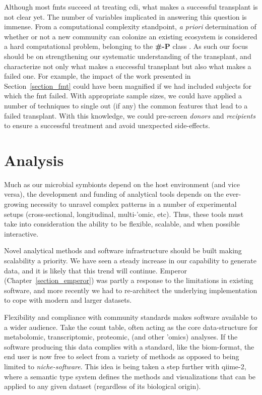 Although most \glspl{fmt} succeed at treating \gls{cdi}, what makes a
successful transplant is not clear yet. The number of variables implicated in
answering this question is immense. From a computational complexity standpoint,
\textit{a priori} determination of whether or not a new community can colonize 
an existing ecosystem is considered a hard computational problem, belonging to 
the \textbf{\#-P} class \cite{RN4266}. As such our focus should be on 
strengthening our systematic understanding of the transplant, and characterize 
not only what makes a successful transplant but also what makes a failed one.  
For example, the impact of the work presented in Section~\ref{section_fmt} 
could have been magnified if we had included subjects for which the \gls{fmt} 
failed. With appropriate sample sizes, we could have applied a number of 
techniques to single out (if any) the common features that lead to a failed 
transplant. With this knowledge, we could pre-screen \textit{donors} and 
\textit{recipients} to ensure a successful treatment and avoid unexpected 
side-effects.

\section{Analysis}

Much as our microbial symbionts depend on the host environment (and vice
versa), the development and funding of analytical tools depends on the
ever-growing necessity to unravel complex patterns in a number of experimental
setups (cross-sectional, longitudinal, multi-'omic, etc). Thus, these tools
must take into consideration the ability to be flexible, scalable, and when
possible interactive.

Novel analytical methods and software infrastructure should be built making 
scalability a priority.  We have seen a steady increase in our capability to 
generate data, and it is likely that this trend will continue. Emperor 
(Chapter~\ref{section_emperor}) was partly a response to the limitations in 
existing software, and more recently we had to re-architect the underlying 
implementation to cope with modern and larger datasets.

Flexibility and compliance with community standards makes software available
to a wider audience. Take the count table, often acting as the core
data-structure for metabolomic, transcriptomic, proteomic, (and other 'omics)
analyses. If the software producing this data complies with a standard, like
the \gls{biom}-format, the end user is now free to select from a variety of
methods as opposed to being limited to \textit{niche-software}. This idea is 
being taken a step further with \gls{qiime}-2, where a semantic type system 
defines the methods and visualizations that can be applied to any given dataset 
(regardless of its biological origin).

